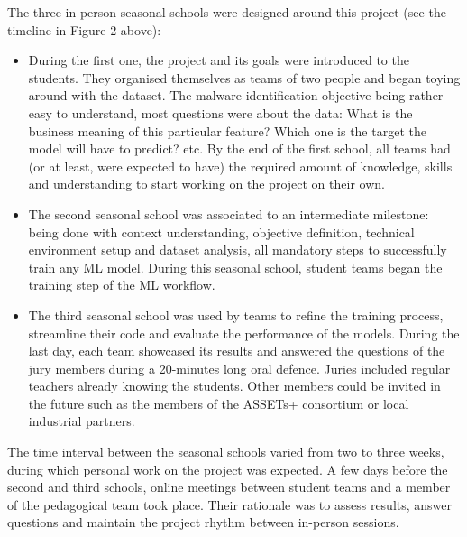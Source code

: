 \documentclass[conference]{IEEEtran}
\begin{document}
\noindent The three in-person seasonal schools were designed around this project (see the timeline in Figure 2 above):
\begin{itemize}
\item During the first one, the project and its goals were introduced to the students. They organised themselves as teams of two people and began toying around with the dataset. The malware identification objective being rather easy to understand, most questions were about the data: What is the business meaning of this particular feature? Which one is the target the model will have to predict? etc. By the end of the first school, all teams had (or at least, were expected to have) the required amount of knowledge, skills and understanding to start working on the project on their own.
\item The second seasonal school was associated to an intermediate milestone: being done with context understanding, objective definition, technical environment setup and dataset analysis, all mandatory steps to successfully train any ML model. During this seasonal school, student teams began the training step of the ML workflow.
\item The third seasonal school was used by teams to refine the training process, streamline their code and evaluate the performance of the models. During the last day, each team showcased its results and answered the questions of the jury members during a 20-minutes long oral defence. Juries included regular teachers already knowing the students. Other members could be invited in the future such as the members of the ASSETs+ consortium or local industrial partners.
\end{itemize}

\noindent The time interval between the seasonal schools varied from two to three weeks, during which personal work on the project was expected. A few days before the second and third schools, online meetings between student teams and a member of the pedagogical team took place. Their rationale was to assess results, answer questions and maintain the project rhythm between in-person sessions.

\end{document}
